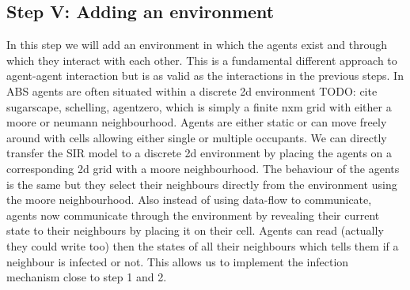 \subsection{Step V: Adding an environment}
In this step we will add an environment in which the agents exist and through which they interact with each other. This is a fundamental different approach to agent-agent interaction but is as valid as the interactions in the previous steps.
In ABS agents are often situated within a discrete 2d environment TODO: cite sugarscape, schelling, agentzero, which is simply a finite nxm grid with either a moore or neumann neighbourhood. Agents are either static or can move freely around with cells allowing either single or multiple occupants. 
We can directly transfer the SIR model to a discrete 2d environment by placing the agents on a corresponding 2d grid with a moore neighbourhood. The behaviour of the agents is the same but they select their neighbours directly from the environment using the moore neighbourhood. Also instead of using data-flow to communicate, agents now communicate through the environment by revealing their current state to their neighbours by placing it on their cell. Agents can read (actually they could write too) then the states of all their neighbours which tells them if a neighbour is infected or not. This allows us to implement the infection mechanism close to step 1 and 2.


